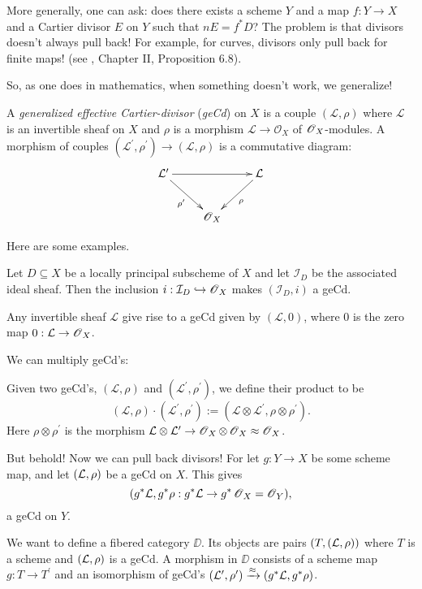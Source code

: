 \documentclass[11pt, english]{article}
\begin{document}
More generally, one can ask: does there exists a scheme $Y$ and a map $f:Y \to X$ and a Cartier divisor $E$ on $Y$ such that $n E = f^\ast D$? The problem is that divisors doesn't always pull back! For example, for curves, divisors only pull back for finite maps! (see \cite{hartshorne}, Chapter II, Proposition 6.8).

So, as one does in mathematics, when something doesn't work, we generalize!

\begin{defi}
A \emph{generalized effective Cartier-divisor} (\emph{geCd}) on $X$ is a couple $(\mathcal L, \rho)$ where $\mathcal L$ is an invertible sheaf on $X$ and $\rho$ is a morphism $\mathcal L \to \mathcal O_X$ of $\operatorname{\mathscr{O}}_X$-modules. A morphism of couples $(\mathcal L^\prime, \rho^\prime) \to (\mathcal L, \rho)$ is a commutative diagram:
\[
\xymatrix{
\LL^\prime \ar[rr]  \ar[dr]_{\rho^\prime} && \LL \ar[dl]^\rho \\
& \OO_X
}
\]
\end{defi}

Here are some examples.
\begin{example}
Let $D \subseteq X$ be a locally principal subscheme of $X$ and let $\mathcal I_D$ be the associated ideal sheaf. Then the inclusion $i:\mathcal I_D \hookrightarrow \operatorname{\mathscr{O}}_X$ makes $(\mathcal I_D,i)$ a geCd.
\end{example}

\begin{example}
Any invertible sheaf $\mathcal L$ give rise to a geCd given by $(\mathcal L, 0)$, where $0$ is the zero map $0:\mathcal L \to \operatorname{\mathscr{O}}_X$.
\end{example}

We can multiply geCd's:
\begin{defi}
Given two geCd's, $(\mathcal L, \rho)$ and $(\mathcal L^\prime, \rho^\prime)$, we define their product to be 
\[
(\mathcal L, \rho) \cdot (\mathcal L^\prime, \rho^\prime) := (\mathcal L \otimes \mathcal L^\prime, \rho \otimes \rho^\prime).
\]
Here $\rho \otimes \rho^\prime$ is the morphism $\mathcal{L} \otimes \mathcal{L}^\prime \to \operatorname{\mathscr{O}}_X \otimes \operatorname{\mathscr{O}}_X \approx \operatorname{\mathscr{O}}_X$.
\end{defi}
But behold! Now we can pull back divisors! For let $g:Y \to X$ be some scheme map, and let $(\mathcal{L},\rho)$ be a geCd on $X$. This gives \[(g^\ast \mathcal{L}, g^\ast \rho:g^\ast \mathcal{L} \to g^\ast \operatorname{\mathscr{O}}_X = \operatorname{\mathscr{O}}_Y),\]
a geCd on $Y$.

We want to define a fibered category $\DD$. Its objects are pairs $(T,(\mathcal{L},\rho))$ where $T$ is a scheme and $(\mathcal{L}, \rho)$ is a geCd. A morphism in $\DD$ consists of a scheme map $g:T \to T^\prime$ and an isomorphism of geCd's $(\mathcal{L}^\prime, \rho^\prime) \xrightarrow{\approx} (g^\ast \mathcal{L}, g^\ast \rho)$.
\end{document}
